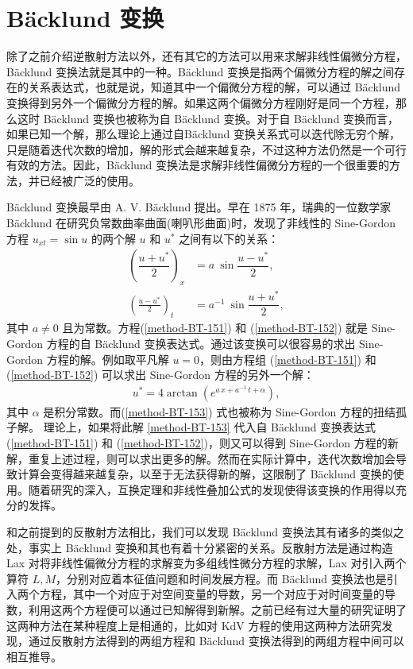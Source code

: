 \section{B\"{a}cklund 变换}
除了之前介绍逆散射方法以外，还有其它的方法可以用来求解非线性偏微分方程，B\"{a}cklund 变换法就是其中的一种。B\"{a}cklund 变换是指两个偏微分方程的解之间存在的关系表达式，也就是说，知道其中一个偏微分方程的解，可以通过 B\"{a}cklund 变换得到另外一个偏微分方程的解。如果这两个偏微分方程刚好是同一个方程，那么这时 B\"{a}cklund 变换也被称为自 B\"{a}cklund 变换。对于自 B\"{a}cklund 变换而言，如果已知一个解，那么理论上通过自B\"{a}cklund 变换关系式可以迭代除无穷个解，只是随着迭代次数的增加，解的形式会越来越复杂，不过这种方法仍然是一个可行有效的方法。因此，B\"{a}cklund 变换法是求解非线性偏微分方程的一个很重要的方法，并已经被广泛的使用。

B\"{a}cklund 变换最早由  A. V. B\"{a}cklund 提出。早在 1875 年，瑞典的一位数学家  B\"{a}cklund 在研究负常数曲率曲面(喇叭形曲面)时，发现了非线性的  Sine-Gordon 方程 $u_{xt}=\sin u $ 的两个解 $u$ 和 $u^*$ 之间有以下的关系：
\begin{eqnarray}
(\dfrac{u+u^*}{2})_{x} & = a\ \sin \dfrac{u-u^*}{2}  , \label{method-BT-151}
\\
 (\frac{u-u^*}{2})_{t} &= a^{-1}\ \sin \dfrac{u+u^*}{2} , \label{method-BT-152}
\end{eqnarray}
其中 $a\neq 0$ 且为常数。方程(\ref{method-BT-151}) 和 (\ref{method-BT-152}) 就是 Sine-Gordon 方程的自 B\"{a}cklund 变换表达式。通过该变换可以很容易的求出 Sine-Gordon 方程的解。例如取平凡解 $u=0$，则由方程组 (\ref{method-BT-151}) 和 (\ref{method-BT-152}) 可以求出 Sine-Gordon 方程的另外一个解：
\begin{eqnarray}
u^*=4\arctan (e^{a\,x+a^{-1}\,t+\alpha} ) ,
\label{method-BT-153}
\end{eqnarray}
其中 $\alpha$ 是积分常数。而(\ref{method-BT-153}) 式也被称为 Sine-Gordon 方程的扭结孤子解。 理论上，如果将此解 \eqref{method-BT-153} 代入自 B\"{a}cklund 变换表达式 (\ref{method-BT-151}) 和 (\ref{method-BT-152})，则又可以得到 Sine-Gordon 方程的新解，重复上述过程，则可以求出更多的解。然而在实际计算中，迭代次数增加会导致计算会变得越来越复杂，以至于无法获得新的解，这限制了 B\"{a}cklund 变换的使用。随着研究的深入，互换定理和非线性叠加公式的发现使得该变换的作用得以充分的发挥。

和之前提到的反散射方法相比，我们可以发现  B\"{a}cklund 变换法其有诸多的类似之处，事实上 B\"{a}cklund 变换和其也有着十分紧密的关系。反散射方法是通过构造 Lax 对将非线性偏微分方程的求解变为多组线性微分方程的求解，Lax 对引入两个算符 $L, M$，分别对应着本征值问题和时间发展方程。而  B\"{a}cklund 变换法也是引入两个方程，其中一个对应于对空间变量的导数，另一个对应于对时间变量的导数，利用这两个方程便可以通过已知解得到新解。之前已经有过大量的研究证明了这两种方法在某种程度上是相通的，比如对 KdV 方程的使用这两种方法研究发现，通过反散射方法得到的两组方程和 B\"{a}cklund 变换法得到的两组方程中间可以相互推导。

